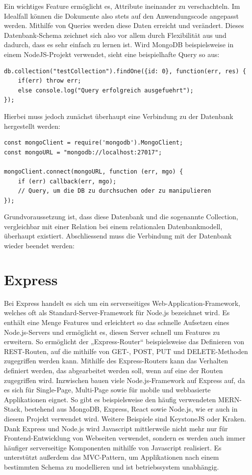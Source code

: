 \documentclass[12pt,a4paper]{report}
\begin{document}
\noindent
Ein wichtiges Feature ermöglicht es, Attribute ineinander zu verschachteln. 
Im Idealfall können die Dokumente also stets auf den Anwendungscode angepasst werden. Mithilfe von Queries werden diese Daten erreicht und verändert. Dieses Datenbank-Schema zeichnet sich also vor allem durch Flexibilität aus und dadurch, dass es sehr einfach zu lernen ist. 
Wird MongoDB beispielsweise in einem NodeJS-Projekt verwendet, sieht eine beispielhafte Query so aus: 

\begin{verbatim}
db.collection("testCollection").findOne({id: 0}, function(err, res) {
    if(err) throw err;
    else console.log("Query erfolgreich ausgefuehrt");
});
\end{verbatim}

Hierbei muss jedoch zunächst überhaupt eine Verbindung zu der Datenbank hergestellt werden: 

\begin{verbatim}
const mongoClient = require('mongodb').MongoClient;
const mongoURL = "mongodb://localhost:27017";

mongoClient.connect(mongoURL, function (err, mgo) {
    if (err) callback(err, mgo);
    // Query, um die DB zu durchsuchen oder zu manipulieren
});
\end{verbatim}

Grundvoraussetzung ist, dass diese Datenbank und die sogenannte Collection, vergleichbar mit einer Relation bei einem relationalen Datenbankmodell, überhaupt existiert.
Abschliessend muss die Verbindung mit der Datenbank wieder beendet werden:

\section{Express}
Bei Express handelt es sich um ein serverseitiges Web-Application-Framework, welches oft als Standard-Server-Framework für Node.js bezeichnet wird. Es enthält eine Menge Features und erleichtert so das schnelle Aufsetzen eines Node.js-Servers und ermöglicht es, diesen Server schnell um Features zu erweitern. 
So ermöglicht der „Express-Router“ beispielsweise das Definieren von REST-Routen, auf die mithilfe von GET-, POST, PUT und DELETE-Methoden zugegriffen werden kann. Mithilfe des Express-Routers kann das Verhalten definiert werden, das abgearbeitet werden soll, wenn auf eine der Routen zugegriffen wird. 
Inzwischen bauen viele Node.js-Framework auf Express auf, da es sich für Single-Page, Multi-Page sowie für mobile und webbasierte Applikationen eignet. So gibt es beispielsweise den häufig verwendeten MERN-Stack, bestehend aus MongoDB, Express, React sowie Node.js, wie er auch in diesem Projekt verwendet wird. Weitere Beispiele sind KeystoneJS oder Kraken.
Dank Express und Node.js wird Javascript mittlerweile nicht mehr nur für Frontend-Entwicklung von Webseiten verwendet, sondern es werden auch immer häufiger serverseitige Komponenten mithilfe von Javascript realisiert.
Es unterstützt außerdem das MVC-Pattern, um Applikationen nach einem bestimmten Schema zu modellieren und ist betriebssystem unabhängig. 
\end{document}
